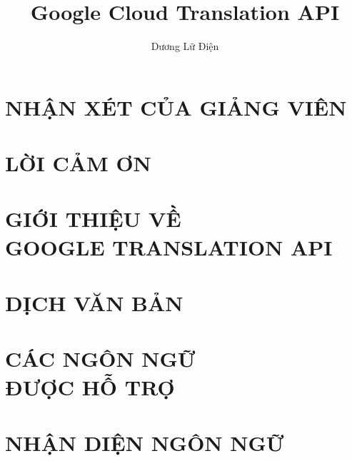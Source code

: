 \documentclass[a4paper,12pt,twoside]{report}
\title{Google Cloud Translation API}	%
\author{Dương Lữ Điện}					%
\begin{document}

\chapter*{NHẬN XÉT CỦA GIẢNG VIÊN}

\chapter*{LỜI CẢM ƠN}
\tableofcontents
\listoffigures
\listoftables

\chapter{GIỚI THIỆU VỀ\\GOOGLE TRANSLATION API}

\chapter{DỊCH VĂN BẢN}


\chapter{CÁC NGÔN NGỮ\\ĐƯỢC HỖ TRỢ}


\chapter{NHẬN DIỆN NGÔN NGỮ}

\end{document}
